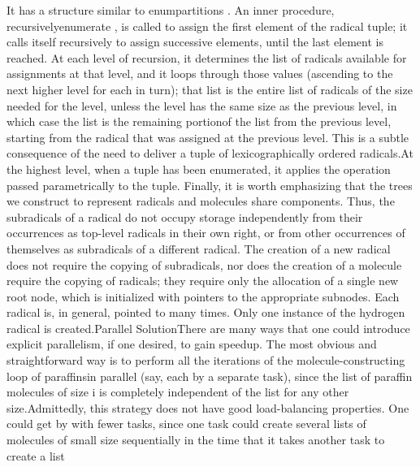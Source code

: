 \FgEndblock[]
 It has a structure similar to \tyxffmxmono[]enum\Symuns[]partitions%
\tyxffmxendmono[]. An inner procedure, \tyxffmxmono[]recursively\Symuns[]enumerate%
\tyxffmxendmono[], is called to assign the first element of the radical
tuple; it calls itself recursively to assign successive elements,
until the last element is reached. At each level of recursion, it
determines the list of radicals available for assignments at that
level, and it loops through those values (ascending to the next higher
level for each in turn); that list is the entire list of radicals
of the size needed for the level, unless the level has the same size
as the previous level, in which case the list is \txtxemph[]the remaining
portion\txtxendemph[] of the list from the previous level, starting
from the radical that was assigned at the previous level.%
\NtFoot[]\NtNtpar[]This is a subtle consequence of the need to deliver
a tuple of lexicographically ordered radicals.\NtEndntpar[]%
\NtEndfoot[] At the highest level, when a tuple has been enumerated,
it applies the operation passed parametrically to the tuple.%
\Endpara[]
\Para[]Finally, it is worth emphasizing that the trees we construct
to represent radicals and molecules share components. Thus, the subradicals
of a radical do not occupy storage independently from their occurrences
as top-level radicals in their own right, or from other occurrences
of themselves as subradicals of a different radical. The creation
of a new radical does not require the copying of subradicals, nor
does the creation of a molecule require the copying of radicals; they
require only the allocation of a single new root node, which is initialized
with pointers to the appropriate subnodes. Each radical is, in general,
pointed to many times. Only one instance of the hydrogen radical is
created.\Endpara[]
\DivEndiv[]
\DivLiv[]\HdMinLiv[]Parallel Solution\HdMinEndiv[]
\Para[]There are many ways that one could introduce explicit parallelism,
if one desired, to gain speedup. The most obvious and straightforward
way is to perform all the iterations of the molecule-constructing
loop of \tyxffmxmono[]paraffins\tyxffmxendmono[] in parallel (say,
each by a separate task), since the list of paraffin molecules of
size \InlEqn[]\LmthEqn[]i
\LmthEndeqn[]\EndInlEqn[] is completely independent of the list for
any other size.\NtFoot[]\NtNtpar[]Admittedly, this strategy does not
have good load-balancing properties. One could get by with fewer tasks,
since one task could create several lists of molecules of small size
sequentially in the time that it takes another task to create a list
